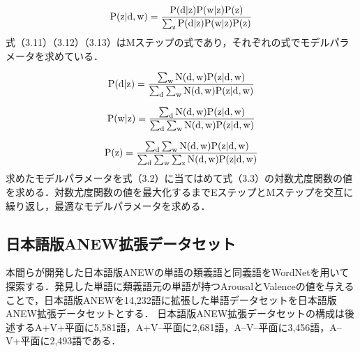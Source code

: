\begin{equation}
\rm{P(z|d,w)=\frac{P(d|z)P(w|z)P(z)}{\sum_zP(d|z)P(w|z)P(z)}}
\end{equation}
式（3.11）（3.12）（3.13）はMステップの式であり，それぞれの式でモデルパラメータを求めている．

\begin{equation}
\rm{P(d|z)=\frac{\sum_wN(d,w)P(z|d,w)}{\sum_d\sum_wN(d,w)P(z|d,w)}}
\end{equation}

\begin{equation}
\rm{P(w|z)=\frac{\sum_dN(d,w)P(z|d,w)}{\sum_d\sum_wN(d,w)P(z|d,w)}}
\end{equation}

\begin{equation}
\rm{P(z)=\frac{\sum_d\sum_wN(d,w)P(z|d,w)}{\sum_d\sum_w\sum_zN(d,w)P(z|d,w)}}
\end{equation}
求めたモデルパラメータを式（3.2）に当てはめて式（3.3）の対数尤度関数の値を求める．対数尤度関数の値を最大化するまでEステップとMステップを交互に繰り返し，最適なモデルパラメータを求める．

\subsection{日本語版ANEW拡張データセット}
本間らが開発した日本語版ANEWの単語の類義語と同義語をWordNet\cite{14}を用いて探索する．発見した単語に類義語元の単語が持つArousalとValenceの値を与えることで，日本語版ANEWを14,232語に拡張した単語データセットを日本語版ANEW拡張データセットとする．
日本語版ANEW拡張データセットの構成は後述するA+V+平面に5,581語，A+V--平面に2,681語，A--V--平面に3,456語，A--V+平面に2,493語である．
\newpage